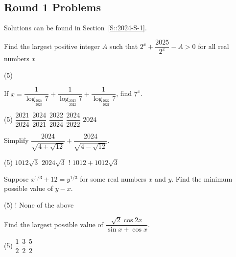 \subsection{Round 1 Problems}

Solutions can be found in Section~\ref{S::2024-S-1}.

\mcq

\begin{enumerate}
    \hyperrefitem[Q::2024-S-1-1] Find the largest positive integer $A$ such that $2^x + \dfrac{2025}{2^x} - A > 0$ for all real numbers $x$
    \begin{tasks}(5)
    \end{tasks}
    \hyperrefitem[Q::2024-S-1-2] If $x = \dfrac{1}{\log_{\frac{2024}{2023}} 7} + \dfrac{1}{\log_{\frac{2023}{2022}} 7} + \dfrac{1}{\log_{\frac{2022}{2021}} 7}$, find $7^x$.
    \begin{tasks}(5)
        \task $\dfrac{2021}{2024}$
        \task $\dfrac{2024}{2021}$
        \task $\dfrac{2022}{2024}$
        \task $\dfrac{2024}{2022}$
        \task $2024$
    \end{tasks}
    \hyperrefitem[Q::2024-S-1-3] Simplify $\dfrac{2024}{\sqrt{4 + \sqrt{12}}} + \dfrac{2024}{\sqrt{4 - \sqrt{12}}}$.
    \begin{tasks}(5)
        \task $1012\sqrt3$
        \task $2024\sqrt3$
        \task! $1012 + 1012\sqrt3$
    \end{tasks}
    \hyperrefitem[Q::2024-S-1-4] Suppose $x^{1/3} + 12 = y^{1/3}$ for some real numbers $x$ and $y$. Find the minimum possible value of $y-x$.
    \begin{tasks}(5)
        \task! None of the above
    \end{tasks}
    \hyperrefitem[Q::2024-S-1-5] Find the largest possible value of $\dfrac{\sqrt2 \cos{2x}}{\sin{x} + \cos{x}}$.
    \begin{tasks}(5)
        \task $\dfrac12$
        \task $\dfrac32$
        \task $\dfrac52$
    \end{tasks}
\end{enumerate}

\sq

